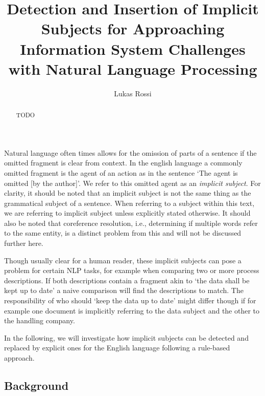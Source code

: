 \documentclass[times, 10pt,twocolumn]{article}
\begin{document}
\title{Detection and Insertion of Implicit Subjects for Approaching Information System Challenges with Natural Language Processing}

\author{Lukas Rossi}

\maketitle
\thispagestyle{empty}

\begin{abstract}
   TODO
\end{abstract}



Natural language often times allows for the omission of parts of a sentence
if the omitted fragment is clear from context. In the english language a
commonly omitted fragment is the agent of an action as in the sentence
`The agent is omitted [by the author]'. We refer to this omitted agent as
an \textit{implicit subject}. For clarity, it should be noted that an implicit
subject is not the same thing as the grammatical subject of a sentence. When referring
to a subject within this text, we are referring to implicit subject unless explicitly
stated otherwise. It should
also be noted that coreference resolution, i.e., determining if multiple words
refer to the same entity, is a distinct problem from this and will not be
discussed further here. 

Though usually clear for a human reader, these implicit subjects can pose a problem
for certain NLP tasks, for example when comparing two or more process descriptions.
If both descriptions contain a fragment akin to `the data shall be kept up to date'
a naive comparison will find the descriptions to match. The responsibility of who
should `keep the data up to date' might differ though if for example one document
is implicitly referring to the data subject and the other to the handling company.

In the following, we will investigate how implicit subjects can be detected and replaced
by explicit ones for the English language following a rule-based approach.





\subsection{Background}\label{methodology:background}
\end{document}
